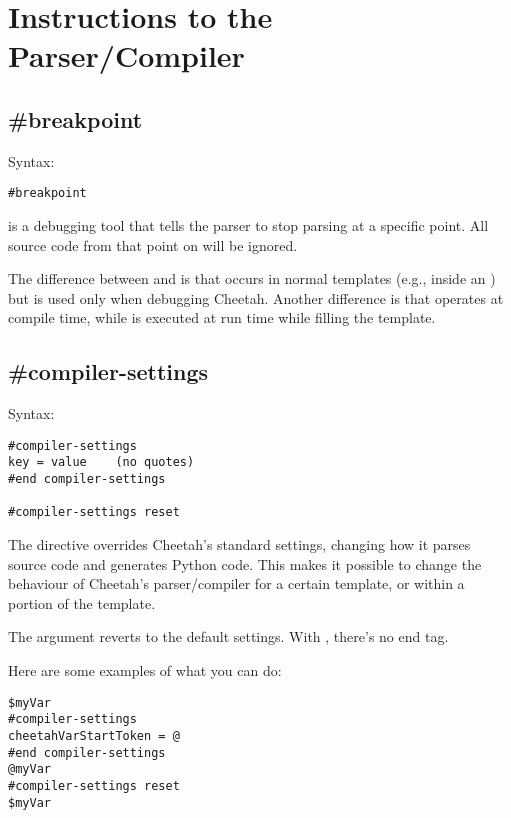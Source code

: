 \section{Instructions to the Parser/Compiler}
\label{parserInstructions}


\subsection{\#breakpoint}
\label{parserInstructions.breakpoint}

Syntax:
\begin{verbatim}
#breakpoint
\end{verbatim}


 is a debugging tool that tells the parser to stop
parsing at a specific point. All source code from that point on will be ignored.

The difference between  and  is that
 occurs in normal templates (e.g., inside an ) but
 is used only when debugging Cheetah.  Another difference is
that  operates at compile time, while  is
executed at run time while filling the template.


\subsection{\#compiler-settings}
\label{parserInstructions.compiler-settings}

Syntax:
\begin{verbatim}
#compiler-settings
key = value    (no quotes)
#end compiler-settings

#compiler-settings reset
\end{verbatim}


The  directive overrides Cheetah's standard settings,
changing how it parses source code and generates Python code.  This
makes it possible to change the behaviour of Cheetah's parser/compiler for a
certain template, or within a portion of the template.

The  argument reverts to the default settings.  With ,
there's no end tag.

Here are some examples of what you can do:
\begin{verbatim}
$myVar
#compiler-settings
cheetahVarStartToken = @
#end compiler-settings
@myVar
#compiler-settings reset
$myVar
\end{verbatim}


